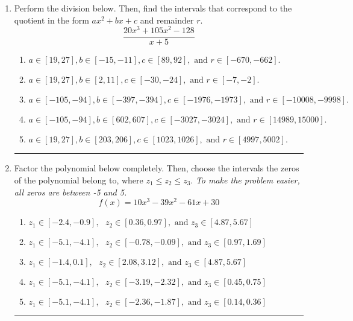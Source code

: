 \documentclass[14pt]{extbook}
\newcommand{\litem}[1]{\item#1\hspace*{-1cm}\rule{\textwidth}{0.4pt}}
\begin{document}
\begin{enumerate}
\litem{
Perform the division below. Then, find the intervals that correspond to the quotient in the form $ax^2+bx+c$ and remainder $r$.\[ \frac{20x^{3} +105 x^{2} -128}{x + 5} \]\begin{enumerate}[label=\Alph*.]
\item \( a \in [19, 27], b \in [-15, -11], c \in [89, 92], \text{ and } r \in [-670, -662]. \)
\item \( a \in [19, 27], b \in [2, 11], c \in [-30, -24], \text{ and } r \in [-7, -2]. \)
\item \( a \in [-105, -94], b \in [-397, -394], c \in [-1976, -1973], \text{ and } r \in [-10008, -9998]. \)
\item \( a \in [-105, -94], b \in [602, 607], c \in [-3027, -3024], \text{ and } r \in [14989, 15000]. \)
\item \( a \in [19, 27], b \in [203, 206], c \in [1023, 1026], \text{ and } r \in [4997, 5002]. \)

\end{enumerate} }
\litem{
Factor the polynomial below completely. Then, choose the intervals the zeros of the polynomial belong to, where $z_1 \leq z_2 \leq z_3$. \textit{To make the problem easier, all zeros are between -5 and 5.}\[ f(x) = 10x^{3} -39 x^{2} -61 x + 30 \]\begin{enumerate}[label=\Alph*.]
\item \( z_1 \in [-2.4, -0.9], \text{   }  z_2 \in [0.36, 0.97], \text{   and   } z_3 \in [4.87, 5.67] \)
\item \( z_1 \in [-5.1, -4.1], \text{   }  z_2 \in [-0.78, -0.09], \text{   and   } z_3 \in [0.97, 1.69] \)
\item \( z_1 \in [-1.4, 0.1], \text{   }  z_2 \in [2.08, 3.12], \text{   and   } z_3 \in [4.87, 5.67] \)
\item \( z_1 \in [-5.1, -4.1], \text{   }  z_2 \in [-3.19, -2.32], \text{   and   } z_3 \in [0.45, 0.75] \)
\item \( z_1 \in [-5.1, -4.1], \text{   }  z_2 \in [-2.36, -1.87], \text{   and   } z_3 \in [0.14, 0.36] \)


\end{enumerate}}
\end{enumerate}
\end{document}
